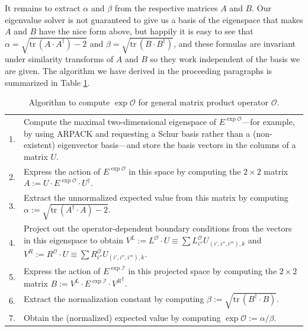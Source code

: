 \documentclass[12pt]{amsbook}
\theoremstyle{plain}
\theoremstyle{definition}
\theoremstyle{remark}
\newcommand{\tr}{\text{tr}\,}
\newcommand{\mexp}[1]{\exp{\mathcal{#1}}}
\begin{document}
It remains to extract $\alpha$ and $\beta$ from the respective matrices $A$ and $B$.  Our eigenvalue solver is not guaranteed to give us a basis of the eigenspace that makes $A$ and $B$ have the nice form above, but happily it is easy to see that $\alpha = \sqrt{\tr(A\cdot A^\dagger)-2}$ and $\beta =\sqrt{\tr(B\cdot B^\dagger)}$, and these formulas are invariant under similarity transforms of $A$ and $B$ so they work independent of the basis we are given.  The algorithm we have derived in the proceeding paragraphs is summarized in Table \ref{MPO-expectation-algorithm}.


\begin{table}
\begin{tabular}{p{0.075in}p{0.15in}p{0.1in}p{2.8in}}
1. & \multicolumn{3}{p{3.3in}}{Compute the maximal two-dimensional eigenspace of $E^{\mexp{O}}$---for example, by using ARPACK \cite{arpack} and requesting a Schur basis rather than a (non-existent) eigenvector basis---and store the basis vectors in the columns of a matrix $U$.} \\
2. & \multicolumn{3}{p{3.3in}}{Express the action of $E^{\mexp{O}}$ in this space by computing the $2\times 2$ matrix $A:=U\cdot E^{\mexp{O}}\cdot U^\dagger.$} \\
3. & \multicolumn{3}{p{3.3in}}{Extract the unnormalized expected value from this matrix by computing $\alpha:=\sqrt{\tr(A^\dagger\cdot A)-2}.$} \\
4. & \multicolumn{3}{p{3.3in}}{Project out the operator-dependent boundary conditions from the vectors in this eigenspace to obtain $V^L:=L^{\mathcal{O}}\cdot U\equiv \sum L^{\mathcal{O}}_{i''} U_{(i',i'',i'''),k}$ and $V^R:=R^{\mathcal{O}}\cdot U\equiv \sum R^{\mathcal{O}}_{i''} U_{(i',i'',i'''),k}$.} \\
5. & \multicolumn{3}{p{3.3in}}{Express the action of $E^{\mexp{I}}$ in this projected space by computing the $2\times 2$ matrix $B:={V^L} \cdot E^{\mexp{I}} \cdot {V^R}^\dagger$.} \\
6. & \multicolumn{3}{p{3.3in}}{Extract the normalization constant by computing $\beta:=\sqrt{\tr(B^\dagger\cdot B)}.$} \\
7. & \multicolumn{3}{p{3.3in}}{Obtain the (normalized) expected value by computing $\mexp{O}:=\alpha/\beta$.}
\end{tabular}
\caption{Algorithm to compute $\mexp{O}$ for general matrix product operator $\mathcal{O}$.}
\label{MPO-expectation-algorithm}
\end{table}
\end{document}

